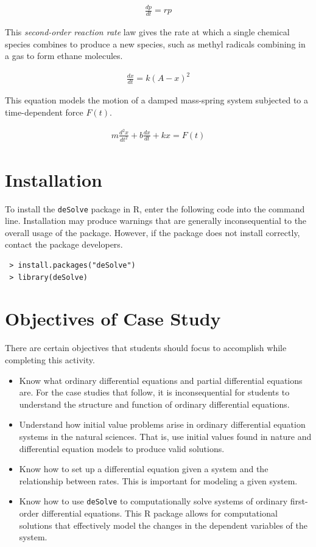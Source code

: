 \begin{gather*}
    \frac{dp}{dt}=rp
\end{gather*}

This \textit{second-order reaction rate} law gives the rate at which a single chemical species combines to produce a new species, such as methyl radicals combining in a gas to form ethane molecules.

\begin{gather*}
    \frac{dx}{dt}=k(A-x)^2
\end{gather*}

This equation models the motion of a damped mass-spring system subjected to a time-dependent force $F(t)$.

\begin{gather*}
    m\frac{d^2 x}{dt^2}+b\frac{dx}{dt}+kx=F(t)
\end{gather*}

\section{Installation}

To install the \texttt{deSolve} package in R, enter the following code into the command line.
Installation may produce warnings that are generally inconsequential to the overall usage of the package.
However, if the package does not install correctly, contact the package developers.

\begin{lstlisting}
 > install.packages("deSolve")
 > library(deSolve)
\end{lstlisting}

\section{Objectives of Case Study}

There are certain objectives that students should focus to accomplish while completing this activity. 

\begin{itemize}
\item Know what ordinary differential equations and partial differential equations are.
For the case studies that follow, it is inconsequential for students to understand the structure and function of ordinary differential equations.

\item Understand how initial value problems arise in ordinary differential equation systems in the natural sciences.
That is, use initial values found in nature and differential equation models to produce valid solutions.

\item Know how to set up a differential equation given a system and the relationship between rates.
This is important for modeling a given system.

\item Know how to use \texttt{deSolve} to computationally solve systems of ordinary first-order differential equations.
This R package allows for computational solutions that effectively model the changes in the dependent variables of the system.
\end{itemize}

